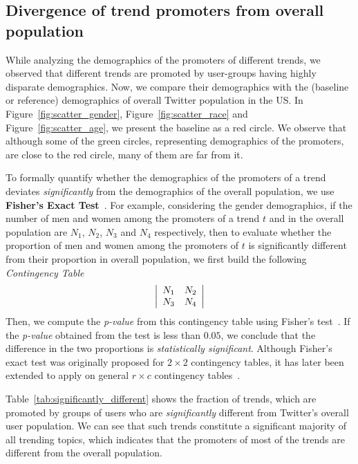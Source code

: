 \documentclass[letterpaper]{article}
\begin{document}
\subsection{Divergence of trend promoters from overall population}
\noindent
While analyzing the demographics of the promoters of different trends, we observed that
different trends are promoted by user-groups having highly disparate demographics.
Now, we compare their demographics with the (baseline or reference)
demographics of overall Twitter population in the US.
In Figure~\ref{fig:scatter_gender}, Figure~\ref{fig:scatter_race} and Figure~\ref{fig:scatter_age},
we present the baseline as a red circle. We observe that although some of the green circles,
representing demographics of the promoters, are close to the red circle, many of them are far from it.

To formally quantify whether the demographics of the promoters of a trend
deviates {\it significantly} from the demographics of the overall population,
we use {\bf Fisher's Exact Test}~\cite{fisher1922interpretation}.
For example, considering the gender demographics, if the
number of men and women among the promoters of a trend $t$
and in the overall population are
$N_1$, $N_2$, $N_3$ and $N_4$ respectively, then to evaluate
whether the proportion of men and women among the promoters of $t$
is significantly different from their proportion in overall population,
we first build the following {\it Contingency Table}
$$
\left| \begin{array}{c c}
N_1 & N_2 \\
N_3 & N_4
\end{array} \right|
$$
Then, we compute the {\it p-value} from this contingency table using Fisher's test~\cite{fisher1922interpretation}.
If the {\it p-value} obtained from the test is less than $0.05$,
we conclude that the difference in the two proportions
is {\it statistically significant}.
Although Fisher's exact test was originally proposed for $2 \times 2$
contingency tables, it has later been extended to apply on general
$r \times c$ contingency tables~\cite{mehta1983network}.

Table~\ref{tab:significantly_different} shows the fraction of trends,
which are promoted by groups of users
who are {\it significantly} different from Twitter's overall user population.
We can see that such trends constitute a significant majority of all trending topics,
which indicates that the promoters of most of the trends are different from the
overall population.
\end{document}
